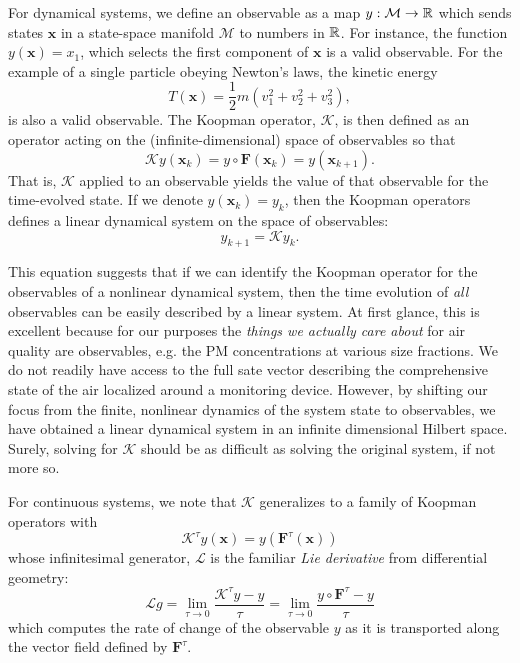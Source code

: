 For dynamical systems, we define an observable as a map $y:\mathcal{M}\to\mathbb{R}$
which sends states $\mathbf{x}$ in a state-space manifold $\mathcal{M}$ to
numbers in $\mathbb{R}$. For instance, the function $y(\mathbf{x})=x_1$, which selects
the first component of $\mathbf{x}$ is a valid observable. For the example of a
single particle obeying Newton's laws, the kinetic energy
\begin{equation}
  T(\mathbf{x}) = \frac{1}{2}m \left(v_1^2+v_2^2+v_3^2\right),
\end{equation}
is also a valid observable. The Koopman operator, $\mathcal{K}$, is then defined
as an operator acting on the (infinite-dimensional) space of observables so that
\begin{equation}
  \mathcal{K}y(\mathbf{x}_k) = y \circ \mathbf{F}(\mathbf{x}_k) = y(\mathbf{x}_{k+1}).
\end{equation}
That is, $\mathcal{K}$ applied to an observable yields the value of that
observable for the time-evolved state. If we denote $y(\mathbf{x}_k)=y_k$, then
the Koopman operators defines a linear dynamical system on the space of
observables:
\begin{equation}
  y_{k+1} = \mathcal{K}y_k.
\end{equation}

This equation suggests that if we can identify the Koopman operator
for the observables of a nonlinear dynamical system, then the time evolution of
\textit{all} observables can be easily described by a linear system. At first
glance, this is excellent because for our purposes the \textit{things we actually
care about} for air quality are observables, e.g. the PM concentrations at
various size fractions. We do not readily have access to the full sate vector
describing the comprehensive state of the air localized around a monitoring
device. However, by shifting our focus from the finite, nonlinear dynamics
of the system state to observables, we have obtained a linear dynamical
system in an infinite dimensional Hilbert space. Surely, solving for
$\mathcal{K}$ should be as difficult as solving the original system, if not
more so.

For continuous systems, we note that $\mathcal{K}$ generalizes to a family of
Koopman operators with
\begin{equation}
  \mathcal{K}^\tau y(\mathbf{x}) = y(\mathbf{F}^\tau(\mathbf{x}))
\end{equation}
whose infinitesimal generator, $\mathcal{L}$ is the familiar \textit{Lie
  derivative} from differential geometry:
\begin{equation}
  \mathcal{L}g = \lim_{\tau \to 0}\frac{\mathcal{K}^\tau y - y}{\tau} = \lim_{\tau \to 0} \frac{y\circ \mathbf{F}^\tau - y}{\tau}
\end{equation}
which computes the rate of change of the observable $y$ as it is transported
along the vector field defined by $\mathbf{F}^\tau$.


